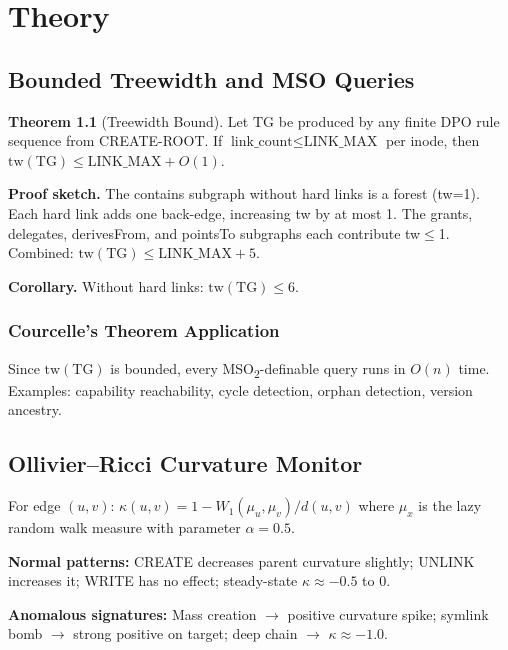 \documentclass[11pt,a4paper,twoside]{report}
\theoremstyle{definition}
\newtheorem{theorem}{Theorem}[chapter]
\newcommand{\TG}{\mathrm{TG}}
\begin{document}
\part{Theory}

\chapter{Bounded Treewidth and MSO Queries}

\begin{theorem}[Treewidth Bound]\label{thm:tw}
Let $\TG$ be produced by any finite DPO rule sequence from CREATE-ROOT.
If $\text{link\_count} \leq \text{LINK\_MAX}$ per inode, then
$\mathrm{tw}(\TG) \leq \text{LINK\_MAX} + O(1)$.
\end{theorem}

\textbf{Proof sketch.} The contains subgraph without hard links is a forest (tw=1). Each hard link adds one back-edge, increasing tw by at most 1. The grants, delegates, derivesFrom, and pointsTo subgraphs each contribute tw$\leq$1. Combined: $\mathrm{tw}(\TG) \leq \text{LINK\_MAX} + 5$.

\textbf{Corollary.} Without hard links: $\mathrm{tw}(\TG) \leq 6$.

\section{Courcelle's Theorem Application}
Since $\mathrm{tw}(\TG)$ is bounded, every MSO\textsubscript{2}-definable query runs in $O(n)$ time.
Examples: capability reachability, cycle detection, orphan detection, version ancestry.

\chapter{Ollivier--Ricci Curvature Monitor}

For edge $(u,v)$: $\kappa(u,v) = 1 - W_1(\mu_u, \mu_v) / d(u,v)$ where $\mu_x$ is the lazy random walk measure with parameter $\alpha = 0.5$.

\textbf{Normal patterns:} CREATE decreases parent curvature slightly; UNLINK increases it; WRITE has no effect; steady-state $\kappa \approx -0.5$ to $0$.

\textbf{Anomalous signatures:} Mass creation $\to$ positive curvature spike; symlink bomb $\to$ strong positive on target; deep chain $\to$ $\kappa \approx -1.0$.
\end{document}
